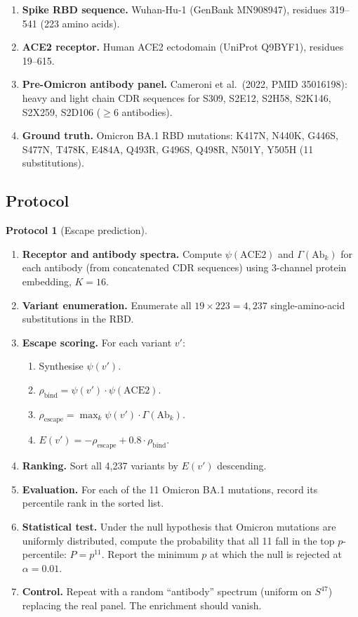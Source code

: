 \documentclass[11pt,a4paper]{article}
\theoremstyle{expthm}
\theoremstyle{definition}
\newtheorem{protocol}[theorem]{Protocol}
\theoremstyle{remark}
\begin{document}
\begin{enumerate}[leftmargin=1.4em,itemsep=2pt]
\item \textbf{Spike RBD sequence.} Wuhan-Hu-1 (GenBank MN908947),
  residues 319--541 (223 amino acids).
\item \textbf{ACE2 receptor.} Human ACE2 ectodomain (UniProt Q9BYF1),
  residues 19--615.
\item \textbf{Pre-Omicron antibody panel.} Cameroni et al.\ (2022,
  PMID 35016198): heavy and light chain CDR sequences for S309, S2E12,
  S2H58, S2K146, S2X259, S2D106 ($\geq 6$ antibodies).
\item \textbf{Ground truth.} Omicron BA.1 RBD mutations: K417N, N440K,
  G446S, S477N, T478K, E484A, Q493R, G496S, Q498R, N501Y, Y505H (11
  substitutions).
\end{enumerate}

\subsection{Protocol}

\begin{protocol}[Escape prediction]
\label{prot:escape}
\leavevmode
\begin{enumerate}[leftmargin=1.4em,itemsep=3pt]
\item \textbf{Receptor and antibody spectra.} Compute $\psi(\mathrm{ACE2})$
  and $\Gamma(\mathrm{Ab}_k)$ for each antibody (from concatenated CDR
  sequences) using 3-channel protein embedding, $K = 16$.
\item \textbf{Variant enumeration.} Enumerate all $19 \times 223 = 4{,}237$
  single-amino-acid substitutions in the RBD.
\item \textbf{Escape scoring.} For each variant $v'$:
  \begin{enumerate}[label=(\roman*),leftmargin=1.8em]
  \item Synthesise $\psi(v')$.
  \item $\rho_{\mathrm{bind}} = \psi(v') \cdot \psi(\mathrm{ACE2})$.
  \item $\rho_{\mathrm{escape}} = \max_k \psi(v') \cdot \Gamma(\mathrm{Ab}_k)$.
  \item $E(v') = -\rho_{\mathrm{escape}} + 0.8 \cdot \rho_{\mathrm{bind}}$.
  \end{enumerate}
\item \textbf{Ranking.} Sort all 4{,}237 variants by $E(v')$ descending.
\item \textbf{Evaluation.} For each of the 11 Omicron BA.1 mutations,
  record its percentile rank in the sorted list.
\item \textbf{Statistical test.} Under the null hypothesis that Omicron
  mutations are uniformly distributed, compute the probability that all
  11 fall in the top $p$-percentile: $P = p^{11}$. Report the minimum
  $p$ at which the null is rejected at $\alpha = 0.01$.
\item \textbf{Control.} Repeat with a random ``antibody'' spectrum
  (uniform on $S^{47}$) replacing the real panel. The enrichment should
  vanish.
\end{enumerate}
\end{protocol}
\end{document}
